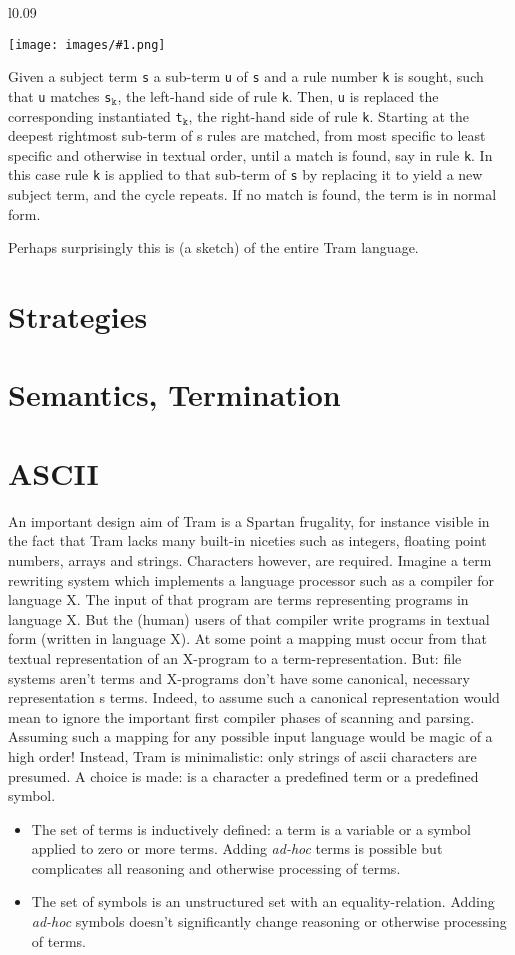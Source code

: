 \documentclass[11pt,twoside]{memoir}
\def\E{\emph} %
\def\T{\texttt}
\newcommand{\warn}[1][Note]{
\begin{wrapfigure}{l}{0.09\textwidth}
  \vspace{-20pt}
  \begin{center}
    \texttt{[image: images/\#1.png]}
  \end{center}
  \vspace{-20pt}
\end{wrapfigure}
\noindent\hspace{-0.5em}
}
\begin{document}
\warn
Given a subject term \T{s} a sub-term \T{u} of \T{s} and a rule number \T{k} is sought, such that \T{u} matches \T{s$_\T{k}$}, the left-hand side of rule \T{k}. Then, \T{u} is replaced the corresponding instantiated \T{t$_\T{k}$}, the right-hand side of rule \T{k}.
Starting at the deepest rightmost sub-term of s rules are matched, from most specific to least specific and otherwise in textual order, until a match is found, say in rule \T{k}. In this case rule \T{k} is applied to that sub-term of \T{s} by replacing it to yield a new subject term, and the cycle repeats. If no match is found, the term is in normal form.

Perhaps surprisingly this is (a sketch) of the entire Tram language. 

\section{Strategies}




\section{Semantics, Termination}

\section{ASCII}
An important design aim of Tram is a Spartan frugality, for instance visible in the fact that Tram lacks many built-in niceties such as integers, floating point numbers, arrays and strings. Characters however, are required.
Imagine a term rewriting system which implements a language processor such as a compiler for language X. The input of that program are terms representing programs in language X. But the (human) users of that compiler write programs in textual form (written in language X). 
At some point a mapping must occur from that textual representation of an X-program to a term-representation. But: file systems aren't terms and X-programs don't have some canonical, necessary representation s terms. Indeed, to assume such a canonical representation would mean to ignore the important first compiler phases of scanning and parsing. Assuming such a mapping for any possible input language would be magic of a high order!
Instead, Tram is minimalistic: only strings of ascii characters are presumed.
A choice is made: is a character a predefined term or a predefined symbol.
\begin{itemize}
\item The set of terms is inductively defined: a term is a variable or a symbol applied to zero or more terms. Adding \E{ad-hoc} terms is possible but complicates all reasoning and otherwise processing of terms.
\item The set of symbols is an unstructured set with an equality-relation. Adding \E{ad-hoc} symbols doesn't significantly change reasoning or otherwise processing of terms.
\end{itemize}
\end{document}
